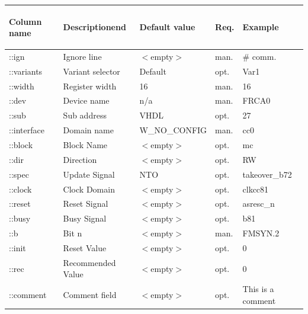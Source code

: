 \documentclass[a4paper,12pt]{report}
\begin{document}
\begin{table}[htb]\begin{tabular}{|l|p{4cm}|p{4cm}|p{15mm}|p{25mm}|}\hline
\begin{bf}Column name\end{bf} & \begin{bf}Descriptionend\end{bf} & \begin{bf}Default value\end{bf} & \begin{bf}Req.\end{bf} & \begin{bf}Example\end{bf}\\\hline
::ign & Ignore line & $<$empty$>$ & man. & \# comm. \\\hline
::variants & Variant selector & Default & opt. & Var1 \\\hline
::width& Register width & 16 & man. & 16 \\\hline
::dev & Device name & n/a & man. & FRCA0 \\\hline
::sub & Sub address & VHDL & opt. & 27 \\\hline
::interface & Domain name & W\_NO\_CONFIG & man. & cc0 \\\hline
::block & Block Name & $<$empty$>$ & opt. & mc \\\hline
::dir & Direction & $<$empty$>$ & opt. & RW \\\hline
::spec & Update Signal & NTO & opt. & takeover\_b72 \\\hline
::clock & Clock Domain & $<$empty$>$ & opt. & clkcc81 \\\hline
::reset & Reset Signal & $<$empty$>$ & opt. & asresc\_n \\\hline
::busy & Busy Signal & $<$empty$>$ & opt. & b81 \\\hline
::b & Bit n & $<$empty$>$ & man. & FMSYN.2 \\\hline
::init & Reset Value & $<$empty$>$ & opt. & 0 \\\hline
::rec & Recommended Value & $<$empty$>$ & opt. & 0 \\\hline
::comment & Comment field & $<$empty$>$ & opt. & This is a comment \\\hline
\end{tabular}\end{table}
\end{document}
